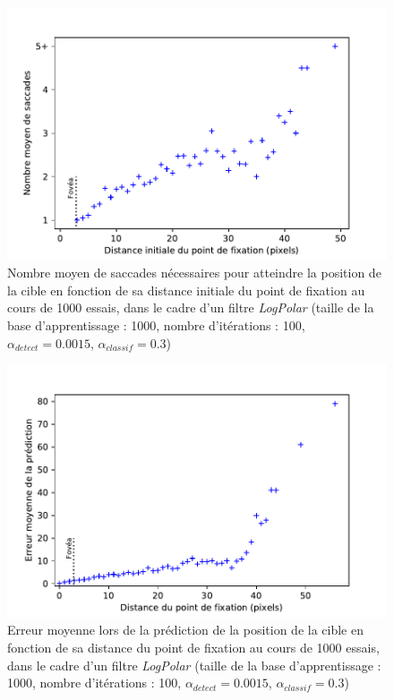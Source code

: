 \begin{figure}[th]
\centering
\includegraphics{Figures/sacc_distance}
\decoRule
\caption[Figure]{Nombre moyen de saccades nécessaires pour atteindre la position de la cible en fonction de sa distance initiale du point de fixation au cours de 1000 essais, dans le cadre d'un filtre \textit{LogPolar} (taille de la base d'apprentissage :  1000, nombre d'itérations : 100, $\alpha_{detect}=0.0015$, $\alpha_{classif}=0.3$)}
\label{fig:sacc_distance}
\end{figure}

\begin{figure}[th]
\centering
\includegraphics[scale=0.95]{Figures/err_distance}
\decoRule
\caption[Figure]{Erreur moyenne lors de la prédiction de la position de la cible en fonction de sa distance du point de fixation au cours de 1000 essais, dans le cadre d'un filtre \textit{LogPolar} (taille de la base d'apprentissage :  1000, nombre d'itérations : 100, $\alpha_{detect}=0.0015$, $\alpha_{classif}=0.3$)}
\label{fig:err_distance}
\end{figure}